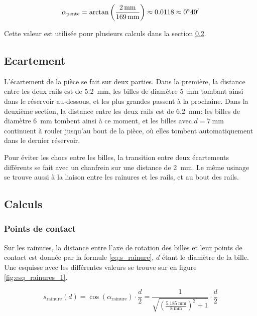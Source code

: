 \[\alpha_{\text{pente}} = \arctan\left(\frac{\SI{2}{\milli\metre}}{\SI{169}{\milli\metre}}\right) \approx \num{0.0118} \approx \sisetup{add-arc-degree-zero} \ang{;40;}\]

Cette valeur est utilisée pour plusieurs calculs dans la section \ref{calculs_tri}.

\subsection{Ecartement}
L'écartement de la pièce se fait sur deux parties. Dans la première, la distance entre les deux rails est de \SI{5.2}{\mm}, les billes de diamètre \SI{5}{\mm} tombant ainsi dans le réservoir au-dessous, et les plus grandes passent à la prochaine. Dans la deuxième section, la distance entre les deux rails est de \SI{6.2}{\mm}: les billes de diamètre \SI{6}{\mm} tombent ainsi à ce moment, et les billes avec $d = \SI{7}{\mm}$ continuent à rouler jusqu'au bout de la pièce, où elles tombent automatiquement dans le dernier réservoir.

Pour éviter les chocs entre les billes, la transition entre deux écartements différents se fait avec un chanfrein sur une distance de \SI{2}{\mm}. Le même usinage se trouve aussi à la liaison entre les rainures et les rails, et au bout des rails.

\subsection{Calculs}
\label{calculs_tri}
\subsubsection{Points de contact}
Sur les rainures, la distance entre l'axe de rotation des billes et leur points de contact est donnée par la formule \ref{eq:s_rainure}, $d$ étant le diamètre de la bille. Une esquisse avec les différentes valeurs se trouve sur en figure \ref{fig:esq_rainures_1}.

\begin{equation}
    s_{\text{rainure}}(d) = \cos(\alpha_{\text{rainure}}) \cdot \frac{d}{2} = \frac{1}{\sqrt{\left(\frac{\SI{5.185}{\milli\metre}}{\SI{8}{\milli\metre}}\right)^2+1}} \cdot \frac{d}{2}
    \label{eq:s_rainure}
\end{equation}

